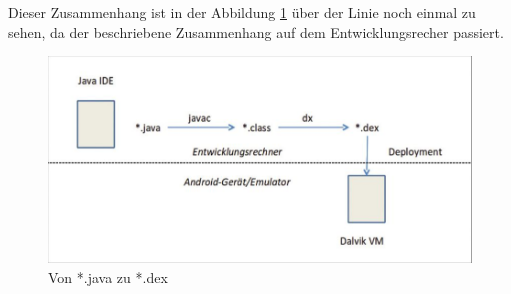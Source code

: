Dieser Zusammenhang ist in der Abbildung \ref{JavaZuDex} \"uber der Linie noch einmal zu sehen, da der beschriebene Zusammenhang auf dem Entwicklungsrecher passiert.

\begin{figure}[!ht]
\centering
\includegraphics[width=12cm]{Bilder/JavaZuDex}
\caption{Von *.java zu *.dex \cite{Android44}}
\label{JavaZuDex}
\centering
\end{figure}